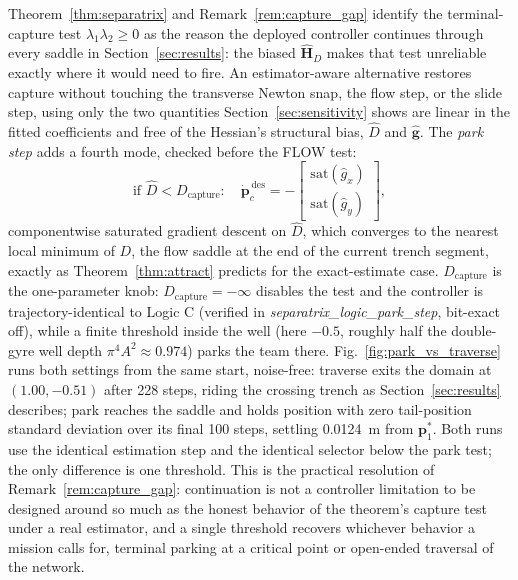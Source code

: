 \documentclass[lettersize,journal]{IEEEtran}
\begin{document}
Theorem~\ref{thm:separatrix} and Remark~\ref{rem:capture_gap} identify
the terminal-capture test $\lambda_1\lambda_2 \geq 0$ as the reason the
deployed controller continues through every saddle in
Section~\ref{sec:results}: the biased $\hat{\mathbf{H}}_D$ makes that
test unreliable exactly where it would need to fire. An estimator-aware
alternative restores capture without touching the transverse Newton
snap, the flow step, or the slide step, using only the two quantities
Section~\ref{sec:sensitivity} shows are linear in the fitted
coefficients and free of the Hessian's structural bias, $\hat{D}$ and
$\hat{\mathbf{g}}$. The \emph{park step} adds a fourth mode, checked
before the FLOW test:
\begin{equation}
    \text{if } \hat{D} < D_{\text{capture}}:\quad
    \dot{\mathbf{p}}_c^{\,\text{des}} =
    -\begin{bmatrix}
        \mathrm{sat}(\hat{g}_x) \\ \mathrm{sat}(\hat{g}_y)
    \end{bmatrix},
    \label{eq:park_step}
\end{equation}
componentwise saturated gradient descent on $\hat{D}$, which converges
to the nearest local minimum of $D$, the flow saddle at the end of the
current trench segment, exactly as Theorem~\ref{thm:attract} predicts
for the exact-estimate case. $D_{\text{capture}}$ is the one-parameter
knob: $D_{\text{capture}} = -\infty$ disables the test and the
controller is trajectory-identical to Logic C (verified in
\textit{separatrix\_logic\_park\_step}, bit-exact off), while a finite
threshold inside the well (here $-0.5$, roughly half the double-gyre
well depth $\pi^4 A^2 \approx 0.974$) parks the team there.
Fig.~\ref{fig:park_vs_traverse} runs both settings from the same start,
noise-free: traverse exits the domain at $(1.00, -0.51)$ after 228
steps, riding the crossing trench as Section~\ref{sec:results}
describes; park reaches the saddle and holds position with zero
tail-position standard deviation over its final 100 steps, settling
0.0124~m from $\mathbf{p}^*_1$. Both runs use the identical estimation
step and the identical selector below the park test; the only
difference is one threshold. This is the practical resolution of
Remark~\ref{rem:capture_gap}: continuation is not a controller limitation
to be designed around so much as the honest behavior of the theorem's
capture test under a real estimator, and a single threshold recovers
whichever behavior a mission calls for, terminal parking at a critical
point or open-ended traversal of the network.
\end{document}
